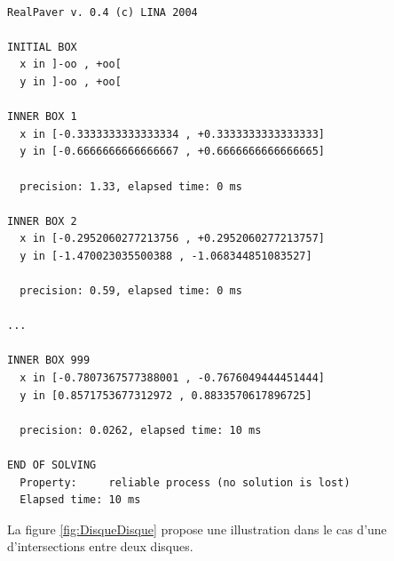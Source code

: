 \begin{verbatim}

RealPaver v. 0.4 (c) LINA 2004

INITIAL BOX
  x in ]-oo , +oo[
  y in ]-oo , +oo[

INNER BOX 1
  x in [-0.3333333333333334 , +0.3333333333333333]
  y in [-0.6666666666666667 , +0.6666666666666665]

  precision: 1.33, elapsed time: 0 ms

INNER BOX 2
  x in [-0.2952060277213756 , +0.2952060277213757]
  y in [-1.470023035500388 , -1.068344851083527]

  precision: 0.59, elapsed time: 0 ms

...

INNER BOX 999
  x in [-0.7807367577388001 , -0.7676049444451444]
  y in [0.8571753677312972 , 0.8833570617896725]

  precision: 0.0262, elapsed time: 10 ms

END OF SOLVING
  Property:     reliable process (no solution is lost)
  Elapsed time: 10 ms
\end{verbatim}
\clearpage
La figure \ref{fig:DisqueDisque} propose une illustration dans le cas d'une d'intersections entre deux disques.
